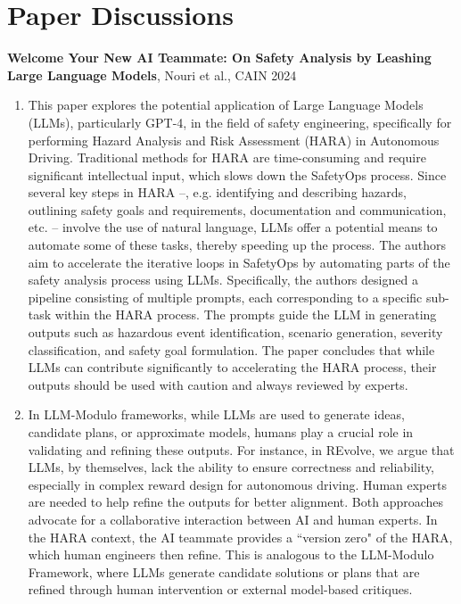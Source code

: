\documentclass[11pt]{article}
\begin{document}
\section*{Paper Discussions}

\textbf{Welcome Your New AI Teammate: On Safety Analysis by Leashing Large Language Models}, Nouri et al., CAIN 2024~\cite{ai_teammate}

\begin{enumerate}[label=(\alph*),leftmargin=*]
    \item This paper explores the potential application of Large Language Models (LLMs), particularly GPT-4, in the field of safety engineering, specifically for performing Hazard Analysis and Risk Assessment (HARA) in Autonomous Driving. Traditional methods for HARA are time-consuming and require significant intellectual input, which slows down the SafetyOps process. Since several key steps in HARA –, e.g. identifying and describing hazards, outlining safety goals and requirements, documentation and communication, etc. –  involve the use of natural language, LLMs offer a potential means to automate some of these tasks, thereby speeding up the process. The authors aim to accelerate the iterative loops in SafetyOps by automating parts of the safety analysis process using LLMs. Specifically, the authors designed a pipeline consisting of multiple prompts, each corresponding to a specific sub-task within the HARA process. The prompts guide the LLM in generating outputs such as hazardous event identification, scenario generation, severity classification, and safety goal formulation. The paper concludes that while LLMs can contribute significantly to accelerating the HARA process, their outputs should be used with caution and always reviewed by experts.
    
    \item In LLM-Modulo frameworks, while LLMs are used to generate ideas, candidate plans, or approximate models, humans play a crucial role in validating and refining these outputs. For instance, in REvolve, we argue that LLMs, by themselves, lack the ability to ensure correctness and reliability, especially in complex reward design for autonomous driving. Human experts are needed to help refine the outputs for better alignment. Both approaches advocate for a collaborative interaction between AI and human experts. In the HARA context, the AI teammate provides a ``version zero" of the HARA, which human engineers then refine. This is analogous to the LLM-Modulo Framework, where LLMs generate candidate solutions or plans that are refined through human intervention or external model-based critiques. 
    

\end{enumerate}
\end{document}
